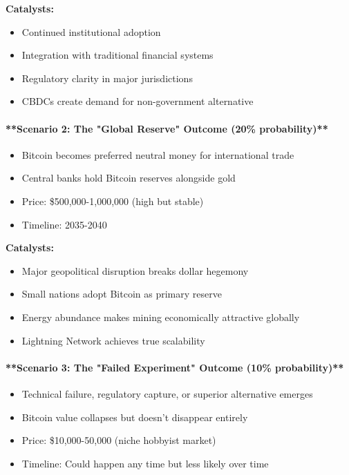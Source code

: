 \documentclass[11pt,oneside]{book}
\begin{document}
\textbf{Catalysts:}
\begin{itemize}
\item Continued institutional adoption
\item Integration with traditional financial systems
\item Regulatory clarity in major jurisdictions
\item CBDCs create demand for non-government alternative
\end{itemize}

\paragraph{**Scenario 2: The "Global Reserve" Outcome (20\% probability)**}
\begin{itemize}
\item Bitcoin becomes preferred neutral money for international trade
\item Central banks hold Bitcoin reserves alongside gold
\item Price: \$500,000-1,000,000 (high but stable)
\item Timeline: 2035-2040
\end{itemize}

\textbf{Catalysts:}
\begin{itemize}
\item Major geopolitical disruption breaks dollar hegemony
\item Small nations adopt Bitcoin as primary reserve
\item Energy abundance makes mining economically attractive globally
\item Lightning Network achieves true scalability
\end{itemize}

\paragraph{**Scenario 3: The "Failed Experiment" Outcome (10\% probability)**}
\begin{itemize}
\item Technical failure, regulatory capture, or superior alternative emerges
\item Bitcoin value collapses but doesn't disappear entirely
\item Price: \$10,000-50,000 (niche hobbyist market)
\item Timeline: Could happen any time but less likely over time
\end{itemize}
\end{document}

